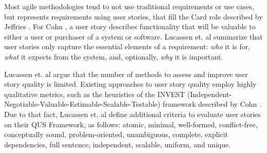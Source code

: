 Most agile methodologies tend to not use traditional requirements or use cases, but represents requirements using user stories, that fill the Card role described by Jeffries \cite{Jeffries_2001}. For Cohn \cite{Cohn_2004}, a user story describes functionality that will be valuable to either a user or purchaser of a system or software. Lucassen et. al \cite{Lucassen_et_dot_al_2015} summarize that user stories only capture the essential elements of a requirement: \textit{who} it is for, \textit{what} it expects from the system, and, optionally, \textit{why} it is important.

Lucassen et. al \cite{Lucassen_et_dot_al_2015} argue that the number of methods to assess and improve user story quality is limited. Existing approaches to user story quality employ highly qualitative metrics, such as the heuristics of the INVEST (Independent-Negotiable-Valuable-Estimable-Scalable-Testable) framework described by Cohn \cite{Cohn_2004}. Due to that fact, Lucassen et. al \cite{Lucassen_et_dot_al_2015} define additional criteria to evaluate user stories on their QUS Framework, as follows: atomic, minimal, well-formed, conflict-free, conceptually sound, problem-oriented, unambiguous, complete, explicit dependencies, full sentence, independent, scalable, uniform, and unique.
